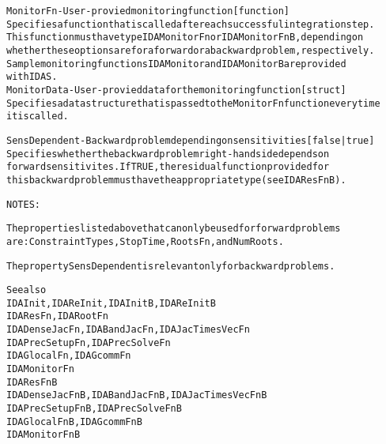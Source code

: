 \begin{alltt}
MonitorFn - User-provied monitoring function [ function ]
   Specifies a function that is called after each successful integration step.
   This function must have type IDAMonitorFn or IDAMonitorFnB, depending on
   whether these options are for a forward or a backward problem, respectively.
   Sample monitoring functions IDAMonitor and IDAMonitorB are provided
   with IDAS.
MonitorData - User-provied data for the monitoring function [ struct ]
   Specifies a data structure that is passed to the MonitorFn function every time
   it is called.

SensDependent - Backward problem depending on sensitivities [ {false} | true ]
   Specifies whether the backward problem right-hand side depends on
   forward sensitivites. If TRUE, the residual function provided for
   this backward problem must have the appropriate type (see IDAResFnB).


NOTES:

   The properties listed above that can only be used for forward problems
   are: ConstraintTypes, StopTime, RootsFn, and NumRoots.

   The property SensDependent is relevant only for backward problems.

   See also
        IDAInit, IDAReInit, IDAInitB, IDAReInitB
        IDAResFn, IDARootFn
        IDADenseJacFn, IDABandJacFn, IDAJacTimesVecFn
        IDAPrecSetupFn, IDAPrecSolveFn
        IDAGlocalFn, IDAGcommFn
        IDAMonitorFn
        IDAResFnB
        IDADenseJacFnB, IDABandJacFnB, IDAJacTimesVecFnB
        IDAPrecSetupFnB, IDAPrecSolveFnB
        IDAGlocalFnB, IDAGcommFnB
        IDAMonitorFnB
\end{alltt}






\vspace{0.1in}